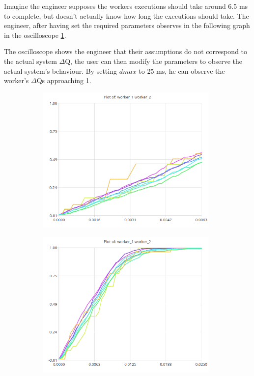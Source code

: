         Imagine the engineer supposes the workers executions should take around 6.5 ms to complete, but doesn't actually know how long the executions should take. The engineer, after having set the required parameters observes in the following graph in the oscilloscope \ref{fig:w1w2}.

    The oscilloscope shows the engineer that their assumptions do not correspond to the actual system $\Delta$Q, the user can then modify the parameters to observe the actual system's behaviour. By setting $dmax$ to 25 ms, he can observe the worker's $\Delta$Qs approaching 1.

\begin{figure}[H]
            \centering
            \begin{subfigure}{.5\textwidth}
                \centering
                \includegraphics[width=0.98\textwidth]{img/w1w2.png}
                \label{fig:w1w2}
            \end{subfigure}%
            \begin{subfigure}{.5\textwidth}
                \centering
                \includegraphics[width =0.98\textwidth]{img/w1w2hb.png}

\end{subfigure}
\end{figure}
